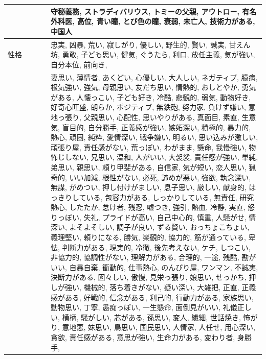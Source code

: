 \documentclass[a4j,12pt]{jsreport}
\begin{document}
    
\setlongtables
\begin{tabularx}{\textwidth}{l|X}
   　　　　　& 守秘義務, ストラディバリウス, トミーの父親, アウトロー, 有名外科医, 高位, 青い瞳, とび色の瞳, 衰弱, 未亡人, 技術力がある, 中国人\\
   \hline
   性格 & 忠実, 凶暴, 荒い, 寂しがり, 優しい, 野生的, 賢い, 誠実, 甘えん坊, 勇敢, 子ども思い, 健気, ぐうたら, 利口, 放任主義, 気が強い, 自分本位, 前向き, \\
   &妻思い, 薄情者, あくどい, 心優しい, 大人しい, ネガティブ, 臆病, 根気強い, 強気, 母親思い, 友だち思い, 情熱的, おしとやか, 勇気がある, 人懐っこい, 子ども好き, 冷酷, 悲観的, 弱気, 動物好き, 好奇心旺盛, 朗らか, ポジティブ, 無鉄砲, 努力家, 負けず嫌い, 意地っ張り, 父親思い, 心配性, 思いやりがある, 真面目, 素直, 生意気, 盲目的, 自分勝手, 正義感が強い, 嫉妬深い, 積極的, 暴力的, 熱心, 頑固, 純粋, 愛情深い, 戦争嫌い, 明るい, 思い込みが激しい, 頑張り屋, 責任感がない, 荒っぽい, わがまま, 懸命, 我慢強い, 物怖じしない, 兄思い, 温和, 人がいい, 大袈裟, 責任感が強い, 単純, 弟思い, 親思い, 頼り甲斐がある, 自信家, 気が短い, 恋人思い, 猟奇的, いい加減, 根性がない, 必死, 諦めが悪い, 強欲, 執念深い, 無謀, がめつい, 押し付けがましい, 息子思い, 厳しい, 献身的, はっきりしている, 包容力がある, しっかりしている, 無責任, 研究熱心, したたか, 怠け者, 残忍, 嘘つき, 強引, 熱血, 冷静, 実直, 怒りっぽい, 失礼, プライドが高い, 自己中心的, 慎重, 人騒がせ, 情深い, よそよそしい, 調子が良い, ずる賢い, おっちょこちょい, 義理堅い, 頼りになる, 勝気, 楽観的, 協力的, 筋が通っている, 卑怯, 判断力がある, 現実的, 冷徹, 後先考えない, ケチ, しつこい, 非協力的, 協調性がない, 理解力がある, 合理的, 一途, 残酷, 勘がいい, 自暴自棄, 衝動的, 仕事熱心, のんびり屋, ワンマン, 不誠実, 決断力がある, 図々しい, 傲慢, 見栄っ張り, 娘思い, せっかち, 押しが強い, 機械的, 落ち着きがない, 疑い深い, 大雑把, 正直, 正義感がある, 好戦的, 信念がある, 利己的, 行動力がある, 家族思い, 動物思い, 丁寧, 愚痴っぽい, 一生懸命, 面倒見がいい, 礼儀正しい, 横柄, 騒がしい, 芯がある, 孫思い, 変人, 繊細, 世話焼き, 怖がり, 意地悪, 妹思い, 鳥思い, 国民思い, 人情家, 人任せ, 用心深い, 貪欲, 責任感がある, 意思が強い, 生命力がある, 変わり者, 身勝手,\\
   \hline
\end{tabularx} 
\end{document}
